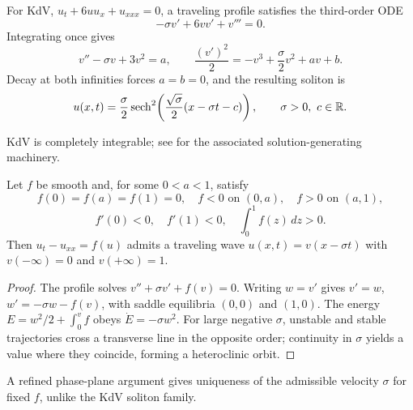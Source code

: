 \begin{example}
\label{ex:kdv-soliton-traveling-wave}

For KdV, $u_t+6uu_x+u_{xxx}=0$, a traveling profile satisfies the
third-order ODE
\[
-\sigma v'+6vv'+v'''=0.
\]
Integrating once gives
\[
v''-\sigma v+3v^2=a,\qquad
\frac{(v')^2}{2}=-v^3+\frac\sigma2v^2+av+b.
\]
Decay at both infinities forces $a=b=0$, and the resulting soliton is
\[
u(x,t)=\frac\sigma2\operatorname{sech}^2\!\left(\frac{\sqrt\sigma}{2}(x-\sigma t-c)\right),
\qquad \sigma>0,\ c\in\mathbb{R}.
\]
\end{example}

\begin{remark}
\label{rem:kdv-complete-integrability}

KdV is completely integrable; see \cite{Drazin1983} for the associated
solution-generating machinery.
\end{remark}

\begin{theorem}
\label{thm:bistable-traveling-wave-existence}

Let $f$ be smooth and, for some $0<a<1$, satisfy
\[
f(0)=f(a)=f(1)=0,\quad f<0\text{ on }(0,a),\quad f>0\text{ on }(a,1),
\]
\[
f'(0)<0,\quad f'(1)<0,\quad \int_0^1f(z)\,dz>0.
\]
Then $u_t-u_{xx}=f(u)$ admits a traveling wave
$u(x,t)=v(x-\sigma t)$ with $v(-\infty)=0$ and $v(+\infty)=1$.
\end{theorem}

\begin{proof}
\sketch The profile solves $v''+\sigma v'+f(v)=0$. Writing $w=v'$ gives
$v'=w$, $w'=-\sigma w-f(v)$, with saddle equilibria $(0,0)$ and $(1,0)$.
The energy $E=w^2/2+\int_0^vf$ obeys $\dot E=-\sigma w^2$. For large negative
$\sigma$, unstable and stable trajectories cross a transverse line in the
opposite order; continuity in $\sigma$ yields a value where they coincide,
forming a heteroclinic orbit.
\end{proof}

\begin{remark}
\label{rem:bistable-traveling-wave-velocity-uniqueness}

A refined phase-plane argument gives uniqueness of the admissible velocity
$\sigma$ for fixed $f$, unlike the KdV soliton family.
\end{remark}

